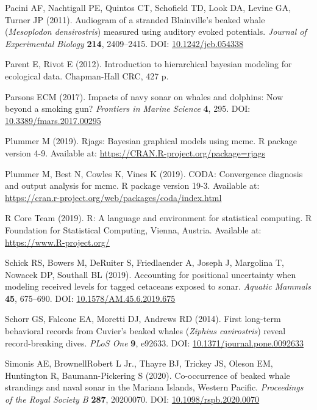 \documentclass[
]{article}
\begin{document}
\leavevmode\hypertarget{ref-Pacini2011}{}%
Pacini AF, Nachtigall PE, Quintos CT, Schofield TD, Look DA, Levine GA, Turner JP (2011). Audiogram of a stranded Blainville's beaked whale (\emph{Mesoplodon densirostris}) measured using auditory evoked potentials. \emph{Journal of Experimental Biology} \textbf{214}, 2409--2415. DOI: \href{https://doi.org/10.1242/jeb.054338}{10.1242/jeb.054338}

\leavevmode\hypertarget{ref-Parent2012}{}%
Parent E, Rivot E (2012). Introduction to hierarchical bayesian modeling for ecological data. Chapman-Hall CRC, 427 p.

\leavevmode\hypertarget{ref-Parsons2017}{}%
Parsons ECM (2017). Impacts of navy sonar on whales and dolphins: Now beyond a smoking gun? \emph{Frontiers in Marine Science} \textbf{4}, 295. DOI: \href{https://doi.org/10.3389/fmars.2017.00295}{10.3389/fmars.2017.00295}

\leavevmode\hypertarget{ref-Plummer2019}{}%
Plummer M (2019). Rjags: Bayesian graphical models using mcmc. R package version 4-9. Available at: \url{https://CRAN.R-project.org/package=rjags}

\leavevmode\hypertarget{ref-Plummer2019b}{}%
Plummer M, Best N, Cowles K, Vines K (2019). CODA: Convergence diagnosis and output analysis for mcmc. R package version 19-3. Available at: \url{https://cran.r-project.org/web/packages/coda/index.html}

\leavevmode\hypertarget{ref-RDev2019}{}%
R Core Team (2019). R: A language and environment for statistical computing. R Foundation for Statistical Computing, Vienna, Austria. Available at: \url{https://www.R-project.org/}

\leavevmode\hypertarget{ref-Schick2019}{}%
Schick RS, Bowers M, DeRuiter S, Friedlaender A, Joseph J, Margolina T, Nowacek DP, Southall BL (2019). Accounting for positional uncertainty when modeling received levels for tagged cetaceans exposed to sonar. \emph{Aquatic Mammals} \textbf{45}, 675--690. DOI: \href{https://doi.org/10.1578/AM.45.6.2019.675}{10.1578/AM.45.6.2019.675}

\leavevmode\hypertarget{ref-Schorr2014}{}%
Schorr GS, Falcone EA, Moretti DJ, Andrews RD (2014). First long-term behavioral records from Cuvier's beaked whales (\emph{Ziphius cavirostris}) reveal record-breaking dives. \emph{PLoS One} \textbf{9}, e92633. DOI: \href{https://doi.org/10.1371/journal.pone.0092633}{10.1371/journal.pone.0092633}

\leavevmode\hypertarget{ref-Simonis2020}{}%
Simonis AE, BrownellRobert L Jr., Thayre BJ, Trickey JS, Oleson EM, Huntington R, Baumann-Pickering S (2020). Co-occurrence of beaked whale strandings and naval sonar in the Mariana Islands, Western Pacific. \emph{Proceedings of the Royal Society B} \textbf{287}, 20200070. DOI: \href{https://doi.org/10.1098/rspb.2020.0070}{10.1098/rspb.2020.0070}
\end{document}
